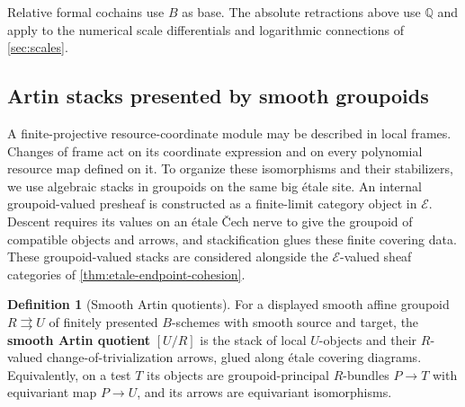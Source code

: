 \documentclass[11pt,a4paper]{article}
\numberwithin{algorithm}{section}
\numberwithin{equation}{section}
\theoremstyle{definition}
\newtheorem{definition}[definition]{Definition}
\theoremstyle{remark}
\theoremstyle{plain}
\newcommand{\E}{\mathcal E}
\newcommand{\QQ}{\mathbb Q}
\theoremstyle{definition}
\theoremstyle{plain}
\begin{document}
Relative formal cochains use $B$ as base. The absolute retractions
above use $\QQ$ and apply to the numerical scale differentials and
logarithmic connections of \cref{sec:scales}.


\subsection{Artin stacks presented by smooth groupoids}
\label{sec:artin-sector}
A finite-projective resource-coordinate module may be described in
local frames. Changes of frame act on its coordinate expression and
on every polynomial resource map defined on it. To organize these
isomorphisms and their stabilizers, we use algebraic stacks in
groupoids on the same big \'etale site.
An internal groupoid-valued presheaf is constructed as a finite-limit
category object in $\E$. Descent requires its values on an
\'etale \v{C}ech nerve to give the groupoid of compatible objects
and arrows, and stackification glues these finite covering data.
These groupoid-valued stacks are considered alongside the $\E$-valued sheaf categories
of \cref{thm:etale-endpoint-cohesion}.

\begin{definition}[Smooth Artin quotients]\label{def:smooth-artin-quotients}
For a displayed smooth affine groupoid $R\rightrightarrows U$
of finitely presented $B$-schemes with smooth source and target,
the \textbf{smooth Artin quotient} $[U/R]$ is the stack of local
$U$-objects and their $R$-valued change-of-trivialization arrows,
glued along \'etale covering diagrams. Equivalently, on a test $T$
its objects are groupoid-principal $R$-bundles $P\to T$ with
equivariant map $P\to U$, and its arrows are equivariant isomorphisms.
\end{definition}
\end{document}
